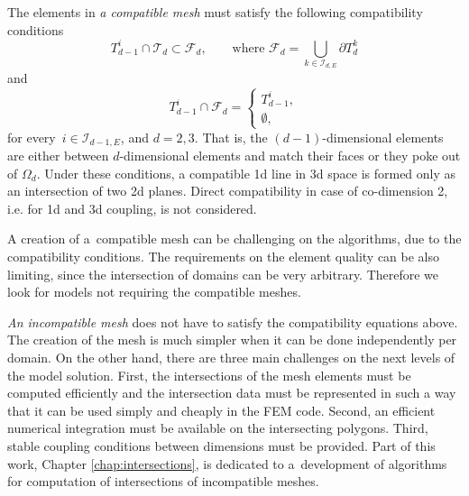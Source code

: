 The elements in \emph{a compatible mesh} must satisfy the following compatibility conditions
\begin{equation}
        T_{d-1}^i \cap \mathcal{T}_d \subset \mathcal{F}_d,  \qquad \text{where } \mathcal{F}_d = \bigcup_{k\in\mathcal{I}_{d,E}} \partial T_{d}^{k}
\end{equation}
and
\begin{equation}
        T_{d-1}^i \cap \mathcal{F}_d = 
        \begin{cases}
            T_{d-1}^i, \\
            \emptyset,
        \end{cases}
\end{equation}
for every $\,i\in\mathcal{I}_{d-1,E}$, and $d=2,3$. 
That is, the $(d-1)$-dimensional elements are either between $d$-dimensional elements and
match their faces or they poke out of $\Omega_d$. 
Under these conditions, a compatible 1d line in 3d space is formed only as an intersection of 
two 2d planes.
Direct compatibility in case of co-dimension 2, i.e. for 1d and 3d coupling, is not considered.


A creation of a~compatible mesh can be challenging on the algorithms, due to the compatibility conditions.
The requirements on the element quality can be also limiting, since the intersection of domains can be very arbitrary.
Therefore we look for models not requiring the compatible meshes.

\emph{An incompatible mesh} does not have to satisfy the compatibility equations above.
The creation of the mesh is much simpler when it can be done independently per domain.
On the other hand, there are three main challenges on the next levels of the model solution.
First, the intersections of the mesh elements must be computed efficiently and the intersection data
must be represented in such a way that it can be used simply and cheaply in the FEM code.
Second, an efficient numerical integration must be available on the intersecting polygons.
Third, stable coupling conditions between dimensions must be provided.
Part of this work, Chapter \ref{chap:intersections}, is dedicated to a~development of algorithms
for computation of intersections of incompatible meshes.







